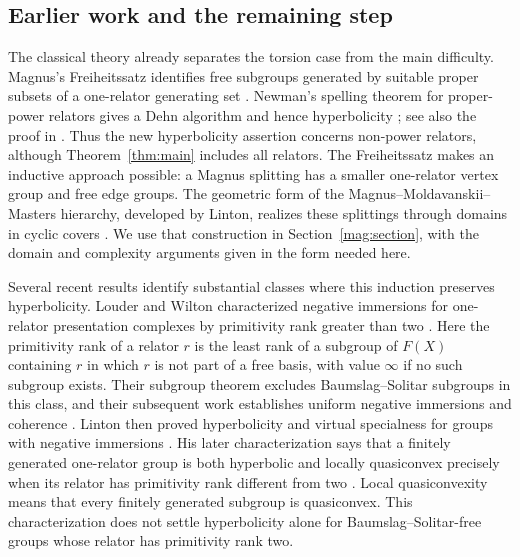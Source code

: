 \subsection{Earlier work and the remaining step}

The classical theory already separates the torsion case from the
main difficulty. Magnus's Freiheitssatz identifies free subgroups
generated by suitable proper subsets of a one-relator generating set
\cite{Magnus1930}. Newman's spelling theorem for proper-power relators
gives a Dehn algorithm and hence hyperbolicity
\cite[Theorem~3]{Newman1968}; see also the proof in
\cite[Theorem~4]{McCoolSchupp1973}. Thus the new hyperbolicity assertion
concerns non-power relators, although Theorem~\ref{thm:main} includes
all relators. The Freiheitssatz makes an inductive approach possible:
a Magnus splitting has a smaller one-relator vertex group and free
edge groups. The geometric form of the
Magnus--Moldavanskii--Masters hierarchy, developed by Linton, realizes
these splittings through domains in cyclic covers
\cite[Sections~1.1--1.2 and~4]{LintonHierarchies2025}.
We use that construction in Section~\ref{mag:section}, with the domain
and complexity arguments given in the form needed here.

Several recent results identify substantial classes where this
induction preserves hyperbolicity. Louder and Wilton characterized
negative immersions for one-relator presentation complexes by
primitivity rank greater than two
\cite[Theorem~1.3]{LouderWilton2022NegativeImmersions}.
Here the primitivity rank of a relator $r$ is the least rank of a
subgroup of $F(X)$ containing $r$ in which $r$ is not part of a free
basis, with value $\infty$ if no such subgroup exists.
Their subgroup theorem excludes Baumslag--Solitar subgroups in this
class, and their subsequent work establishes uniform negative
immersions and coherence
\cite[Corollary~1.8]{LouderWilton2022NegativeImmersions}
\cite[Theorems~A and~C]{LouderWilton2024UniformNegativeImmersions}.
Linton then proved hyperbolicity and virtual specialness for groups
with negative immersions
\cite[Theorem~7.2]{LintonHierarchies2025}.
His later characterization says that a finitely generated one-relator
group is both hyperbolic and locally quasiconvex precisely when its
relator has primitivity rank different from two
\cite[Theorem~1.4]{Linton2025MappingToriSubgroups}.
Local quasiconvexity means that every finitely generated subgroup is
quasiconvex. This characterization does not settle hyperbolicity
alone for Baumslag--Solitar-free groups whose relator has primitivity
rank two.

